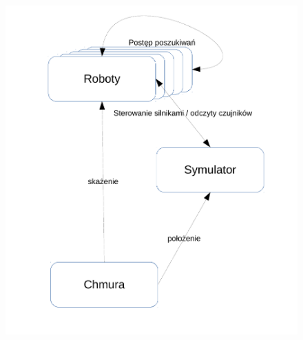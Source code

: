 \documentclass[a4paper, 12pt]{article}
\begin{document}
	\begin{figure}[h!]
	\centering
	\includegraphics[width=0.6\columnwidth]{img/system.pdf}
	\end{figure}
	
	
	
		
	

	
	\clearpage
\end{document}
